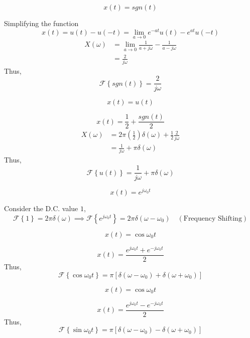 		\begin{eg}
			\[x(t)=sgn(t)\]
		\end{eg}
		\begin{explanation}
			Simplifying the function
			\[x(t)=u(t)-u(-t)=\lim\limits_{a\to 0}e^{-at}u(t)-e^{at}u(-t)\]
			\[\begin{split}
				X(\omega)&=\lim\limits_{a\to0}\frac{1}{a+j\omega} - \frac{1}{a-j\omega}\\
				&=\frac{2}{j\omega}
			\end{split}\]
			Thus,
			\[\mathcal{F}\left\{sgn(t)\right\}=\frac{2}{j\omega}\]
		\end{explanation}
		\begin{eg}
			\[x(t)=u(t)\]
		\end{eg}
		\begin{explanation}
			\[x(t)=\frac{1}{2}+\frac{sgn(t)}{2}\]
			\[\begin{split}
				X(\omega)&=2\pi\left(\frac{1}{2}\right)\delta(\omega)+\frac{1}{2}\frac{2}{j\omega}\\
				&=\frac{1}{j\omega}+\pi\delta(\omega)
			\end{split}\]
			Thus,
			\[\mathcal{F}\left\{u(t)\right\}=\frac{1}{j\omega}+\pi\delta(\omega)\]
		\end{explanation}
		\begin{eg}
			\[x(t)=e^{j\omega_0 t}\]
		\end{eg}
		\begin{explanation}
			Consider the D.C. value $1$,
			\[\mathcal{F}\left\{1\right\}=2\pi\delta(\omega)\implies \mathcal{F}\left\{e^{j\omega_0 t}\right\}=2\pi\delta(\omega-\omega_0) \quad (\text{Frequency Shifting})\]
		\end{explanation}
		\begin{eg}
			\[x(t)=\cos\omega_0t\]
		\end{eg}
		\begin{explanation}
			\[x(t)=\frac{e^{j\omega_0t}+e^{-j\omega_0t}}{2}\]
			Thus,
			\[\mathcal{F}\left\{\cos\omega_0t\right\}=\pi\left[\delta(\omega-\omega_0)+\delta(\omega+\omega_0)\right]\]
		\end{explanation}
		\begin{eg}
			\[x(t)=\cos\omega_0t\]
		\end{eg}
		\begin{explanation}
			\[x(t)=\frac{e^{j\omega_0t}-e^{-j\omega_0t}}{2}\]
			Thus,
			\[\mathcal{F}\left\{\sin\omega_0t\right\}=\pi\left[\delta(\omega-\omega_0)-\delta(\omega+\omega_0)\right]\]
		\end{explanation}
